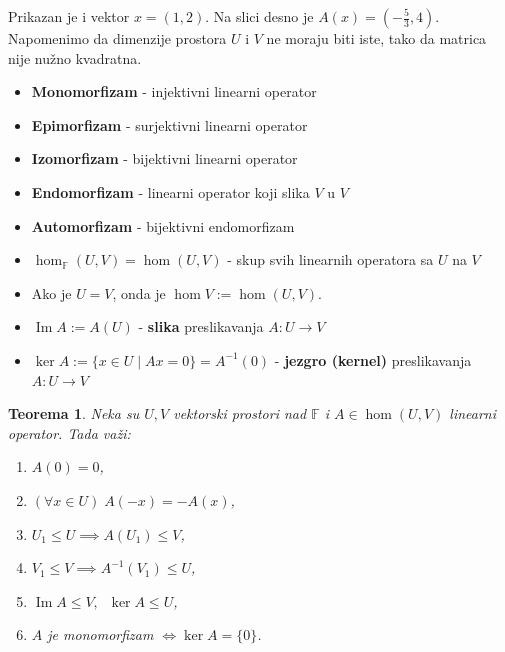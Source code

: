 \documentclass[a4paper,12pt,twoside]{report}
\newtheorem{theorem}{Teorema}[section]
\numberwithin{algorithm}{section}
\begin{document}
\begin{figure}[!h]
    \end{figure}

    \noindent Prikazan je i vektor $x = (1, 2)$. Na slici desno je $A(x) = (-\frac{5}{3}, 4)$. Napomenimo da dimenzije prostora $U$ i $V$ ne moraju biti iste, tako
    da matrica nije nužno kvadratna.
    \vfill
    \newpage
\begin{itemize}
    \item \textbf{Monomorfizam} - injektivni linearni operator
    \item \textbf{Epimorfizam} - surjektivni linearni operator
    \item \textbf{Izomorfizam} - bijektivni linearni operator
    \item \textbf{Endomorfizam} - linearni operator koji slika $V$ u $V$
    \item \textbf{Automorfizam} - bijektivni endomorfizam
    \item $\hom_\mathbb{F}(U, V) = \hom (U, V)$ - skup svih linearnih operatora sa $U$ na $V$
    \item Ako je $U = V$, onda je $\hom V := \hom (U, V)$.
    \item $\operatorname{Im} A := A(U)$ - \textbf{slika} preslikavanja $A:U \to V$
    \item $\ker A := \{x \in U \;|\; Ax = 0\} = A^{-1}(0)$ - \textbf{jezgro (kernel)} preslikavanja $A:U \to V$
\end{itemize}

\begin{theorem}
    Neka su $U, V$ vektorski prostori nad $\mathbb{F}$ i $A \in \hom(U, V)$ linearni operator. Tada važi:
    \begin{enumerate}
        \item $A(0) = 0$,
        \item $(\forall x \in U) \; A(-x) = -A(x)$,
        \item $U_1 \leq U \implies A(U_1) \leq V$,
        \item $V_1 \leq V \implies A^{-1}(V_1) \leq U $,
        \item $\operatorname{Im} A \leq V, \;\; \ker A \leq U$,
        \item $A$ je monomorfizam $\iff \ker A = \{0\}$.
    \end{enumerate}
\end{theorem}
\end{document}
